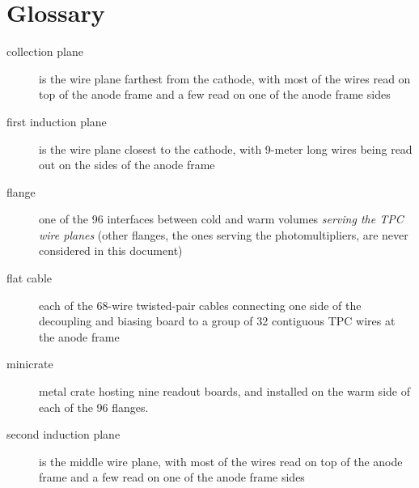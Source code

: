 \section{Glossary}
\label{sec:glossary}

\begin{description}
  \item[collection plane] is the wire plane farthest from the cathode,
    with most of the wires read on top of the anode frame and a few read on one
    of the anode frame sides
  \item[first induction plane] is the wire plane closest to the cathode,
    with 9-meter long wires being read out on the sides of the anode frame
  \item[flange] one of the 96 interfaces between cold and warm volumes
    \emph{serving the TPC wire planes}
    (other flanges, \eg the ones serving the photomultipliers, are never
    considered in this document)
  \item[flat cable] each of the 68-wire twisted-pair cables connecting one side
    of the decoupling and biasing board to a group of 32 contiguous TPC wires
    at the anode frame
  \item[minicrate] metal crate hosting nine readout boards,
    and installed on the warm side of each of the 96 flanges.
  \item[second induction plane] is the middle wire plane,
    with most of the wires read on top of the anode frame and a few read on one
    of the anode frame sides
\end{description}
